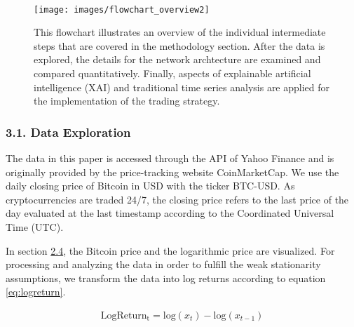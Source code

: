 \documentclass[
]{article}
\begin{document}
~

\begin{figure}

{\centering \texttt{[image: images/flowchart\_overview2]} 

}

\caption{This flowchart illustrates an overview of the individual intermediate steps that are covered in the methodology section. After the data is explored, the details for the network archtecture are examined and compared quantitatively. Finally, aspects of explainable artificial intelligence (XAI) and traditional time series analysis are applied for the implementation of the trading strategy.}\label{fig:flowchart_overview}
\end{figure}

\newpage

\hypertarget{data_exploration}{%
\subsubsection{3.1. Data Exploration}\label{data_exploration}}

The data in this paper is accessed through the API of Yahoo Finance and
is originally provided by the price-tracking website CoinMarketCap. We
use the daily closing price of Bitcoin in USD with the ticker BTC-USD.
As cryptocurrencies are traded 24/7, the closing price refers to the
last price of the day evaluated at the last timestamp according to the
Coordinated Universal Time (UTC).

In section \protect\hyperlink{bitcoin}{2.4}, the Bitcoin price and the
logarithmic price are visualized. For processing and analyzing the data
in order to fulfill the weak stationarity assumptions, we transform the
data into log returns according to equation \ref{eq:logreturn}.

\begin{align} \label{eq:logreturn}
\mathrm{LogReturn_{t}} = \mathrm{log}(x_{t})-\mathrm{log}(x_{t-1})
\end{align}
\end{document}

